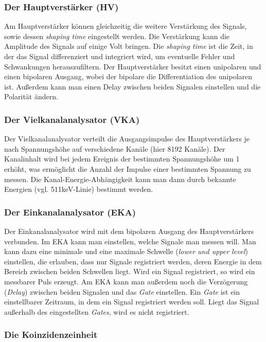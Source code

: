 \subsubsection{Der Hauptverstärker (HV)}

Am Hauptverstärker können gleichzeitig die weitere Verstärkung des Signals, sowie dessen \emph{shaping time} eingestellt werden. Die Verstärkung kann die Amplitude des Signals auf einige Volt bringen.  Die \emph{shaping time} ist die Zeit, in der das Signal differenziert und integriert wird, um eventuelle Fehler und Schwankungen herauszufiltern. Der Hauptverstärker besitzt einen unipolaren und einen bipolaren Ausgang, wobei der bipolare die Differentiation des unipolaren ist. Außerdem kann man einen Delay zwischen beiden Signalen einstellen und die Polarität ändern.

\subsubsection{Der Vielkanalanalysator (VKA)}

Der Vielkanalanalysator verteilt die Ausgangsimpulse des Hauptverstärkers je nach Spannungshöhe auf verschiedene Kanäle (hier 8192 Kanäle). Der Kanalinhalt wird bei jedem Ereignis der bestimmten Spannungshöhe um 1 erhöht, was ermöglicht die Anzahl der Impulse einer bestimmten Spannung zu messen. Die Kanal-Energie-Abhängigkeit kann man dann durch bekannte Energien (vgl. 511keV-Linie) bestimmt werden.

\subsubsection{Der Einkanalanalysator (EKA)}

Der Einkanalanalysator wird mit dem bipolaren Ausgang des Hauptverstärkers verbunden. Im EKA kann man einstellen, welche Signale man messen will. Man kann dazu eine minimale und eine maximale Schwelle (\emph{lower und upper level}) einstellen, die erlauben, dass nur Signale registriert werden, deren Energie in dem Bereich zwischen beiden Schwellen liegt. Wird ein Signal registriert, so wird ein messbarer Puls erzeugt. Am EKA kann man außerdem noch die Verzögerung (\emph{Delay}) zwischen beiden Signalen und das \emph{Gate} einstellen. Ein \emph{Gate} ist ein einstellbarer Zeitraum, in dem ein Signal registriert werden soll. Liegt das Signal außerhalb des eingestellten \emph{Gates}, wird es nicht registriert. 

\subsubsection{Die Koinzidenzeinheit}

